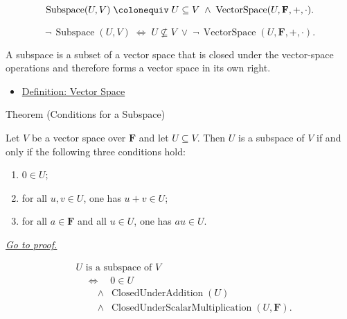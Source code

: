 \begin{remark*}
\[
\operatorname{Subspace}(U,V)
\;\colonequiv\;
U \subseteq V \;\wedge\; \operatorname{VectorSpace}(U,\mathbf{F},+,\cdot).
\]
\end{remark*}

\begin{remark*}
\[
\neg\,\operatorname{Subspace}(U,V)
\;\Longleftrightarrow\;
U \not\subseteq V
\;\vee\;
\neg\,\operatorname{VectorSpace}(U,\mathbf{F},+,\cdot).
\]
\end{remark*}

\begin{remark*}[Interpretation]
A subspace is a subset of a vector space that is closed under the vector-space
operations and therefore forms a vector space in its own right.
\end{remark*}

\begin{remark*}[Dependencies]
\begin{itemize}
  \item \hyperref[def:vector-space]{Definition: Vector Space}
\end{itemize}
\end{remark*}


\begin{theorembox}{Theorem (Conditions for a Subspace)}
\begin{theorem}
\label{thm:conditions-for-a-subspace}
Let $V$ be a vector space over $\mathbf{F}$ and let $U \subseteq V$.
Then $U$ is a subspace of $V$ if and only if the following three conditions hold:
\begin{enumerate}[label=(\roman*)]
  \item $0 \in U$;
  \item for all $u,v \in U$, one has $u+v \in U$;
  \item for all $a \in \mathbf{F}$ and all $u \in U$, one has $au \in U$.
\end{enumerate}
\hyperref[prf:conditions-for-a-subspace]{\textit{Go to proof.}}
\end{theorem}
\end{theorembox}

\begin{remark*}
\[
\begin{aligned}
&U \text{ is a subspace of } V \\
&\quad\Longleftrightarrow\quad
0 \in U \\
&\qquad\land\;
\operatorname{ClosedUnderAddition}(U) \\
&\qquad\land\;
\operatorname{ClosedUnderScalarMultiplication}(U,\mathbf{F}).
\end{aligned}
\]
\end{remark*}

